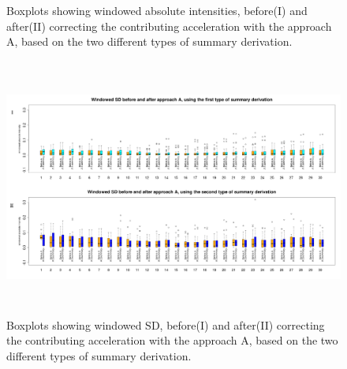 \documentclass{article}
\begin{document}
{\begin{figure}[h!]
\caption{Boxplots showing windowed absolute intensities, before(I) and after(II) correcting the contributing acceleration with the approach A, based on the two different types of summary derivation.}
\end{figure}
\newpage
\begin{figure}[h!]
\includegraphics[width=15cm, height=8.5cm]{result_approach_A_SD_boxplot.png}
\caption{Boxplots showing windowed SD, before(I) and after(II) correcting the contributing acceleration with the approach A, based on the two different types of summary derivation.}
\end{figure}

}
\end{document}

